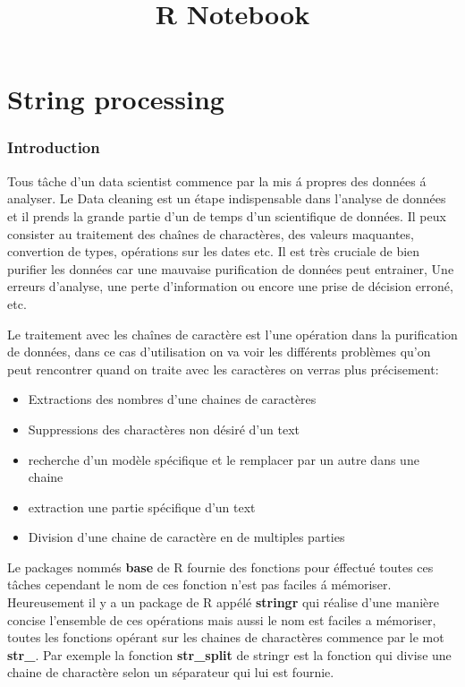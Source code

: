 \documentclass[
]{article}
\title{R Notebook}
\author{}
\date{\vspace{-2.5em}}
\begin{document}
\maketitle

\hypertarget{string-processing}{%
\section{String processing}\label{string-processing}}

\hypertarget{introduction}{%
\subsubsection{Introduction}\label{introduction}}

Tous tâche d'un data scientist commence par la mis á propres des données
á analyser. Le Data cleaning est un étape indispensable dans l'analyse
de données et il prends la grande partie d'un de temps d'un scientifique
de données. Il peux consister au traitement des chaînes de charactères,
des valeurs maquantes, convertion de types, opérations sur les dates
etc. Il est très cruciale de bien purifier les données car une mauvaise
purification de données peut entrainer, Une erreurs d'analyse, une perte
d'information ou encore une prise de décision erroné, etc.

Le traitement avec les chaînes de caractère est l'une opération dans la
purification de données, dans ce cas d'utilisation on va voir les
différents problèmes qu'on peut rencontrer quand on traite avec les
caractères on verras plus précisement:

\begin{itemize}
\item
  Extractions des nombres d'une chaines de caractères
\item
  Suppressions des charactères non désiré d'un text
\item
  recherche d'un modèle spécifique et le remplacer par un autre dans une
  chaine
\item
  extraction une partie spécifique d'un text
\item
  Division d'une chaine de caractère en de multiples parties
\end{itemize}

Le packages nommés \textbf{base} de R fournie des fonctions pour
éffectué toutes ces tâches cependant le nom de ces fonction n'est pas
faciles á mémoriser. Heureusement il y a un package de R appélé
\textbf{stringr} qui réalise d'une manière concise l'ensemble de ces
opérations mais aussi le nom est faciles a mémoriser, toutes les
fonctions opérant sur les chaines de charactères commence par le mot
\textbf{str\_}. Par exemple la fonction \textbf{str\_split} de stringr
est la fonction qui divise une chaine de charactère selon un séparateur
qui lui est fournie.
\end{document}
